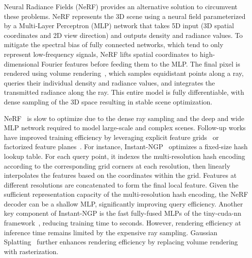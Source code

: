 Neural Radiance Fields (NeRF)\cite{mildenhall2020nerf} provides an alternative solution to circumvent these problems. NeRF represents the 3D scene using a neural field parameterized by a Multi-Layer Perceptron (MLP) network that takes 5D input (3D spatial coordinates and 2D view direction) and outputs density and radiance values. To mitigate the spectral bias\cite{tancik2020fourier} of fully connected networks, which tend to only represent low-frequency signals, NeRF lifts spatial coordinates to high-dimensional Fourier features before feeding them to the MLP. The final pixel is rendered using volume rendering~\cite{levoy1990efficient,max1995optical}, which samples equidistant points along a ray, queries their individual density and radiance values, and integrates the transmitted radiance along the ray. This entire model is fully differentiable, with dense sampling of the 3D space resulting in stable scene optimization. 

NeRF~\cite{mildenhall2020nerf} is slow to optimize due to the dense ray sampling and the deep and wide MLP network required to model large-scale and complex scenes. Follow-up works have improved training efficiency by leveraging explicit feature grids~\cite{mueller2022instant,SunSC22,fridovich2022plenoxels,yu2021plenoxels} or factorized feature planes~\cite{chen2022tensorf,kplanes_2023}. For instance, Instant-NGP~\cite{mueller2022instant} optimizes a fixed-size hash lookup table. For each query point, it indexes the multi-resolution hash encoding according to the corresponding grid corners at each resolution, then linearly interpolates the features based on the coordinates within the grid. Features at different resolutions are concatenated to form the final local feature. Given the sufficient representation capacity of the multi-resolution hash encoding, the NeRF decoder can be a shallow MLP, significantly improving query efficiency. Another key component of Instant-NGP is the fast fully-fused MLPs of the tiny-cuda-nn framework~\cite{tiny-cuda-nn}, reducing training time to seconds. However, rendering efficiency at inference time remains limited by the expensive ray sampling. Gaussian Splatting~\cite{kerbl20233d} further enhances rendering efficiency by replacing volume rendering with rasterization.

